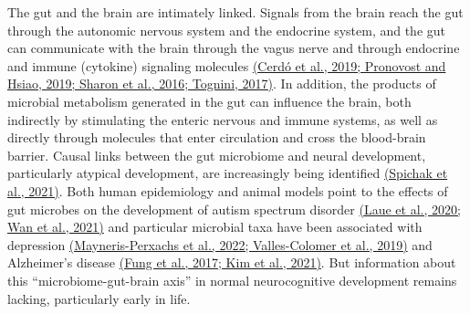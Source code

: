 The gut and the brain are intimately linked. Signals from the brain
reach the gut through the autonomic nervous system and the endocrine
system, and the gut can communicate with the brain through the vagus
nerve and through endocrine and immune (cytokine) signaling molecules
\href{https://www.zotero.org/google-docs/?i3SRPn}{(Cerdó et al., 2019;
Pronovost and Hsiao, 2019; Sharon et al., 2016; Tognini, 2017)}. In
addition, the products of microbial metabolism generated in the gut can
influence the brain, both indirectly by stimulating the enteric nervous
and immune systems, as well as directly through molecules that enter
circulation and cross the blood-brain barrier. Causal links between the
gut microbiome and neural development, particularly atypical
development, are increasingly being identified
\href{https://www.zotero.org/google-docs/?UsrFKB}{(Spichak et al.,
2021)}. Both human epidemiology and animal models point to the effects
of gut microbes on the development of autism spectrum disorder
\href{https://www.zotero.org/google-docs/?Y8l5A0}{(Laue et al., 2020;
Wan et al., 2021)} and particular microbial taxa have been associated
with depression
\href{https://www.zotero.org/google-docs/?mbaFE3}{(Mayneris-Perxachs et
al., 2022; Valles-Colomer et al., 2019)} and Alzheimer's disease
\href{https://www.zotero.org/google-docs/?0BEGUn}{(Fung et al., 2017;
Kim et al., 2021)}. But information about this ``microbiome-gut-brain
axis'' in normal neurocognitive development remains lacking,
particularly early in life.

